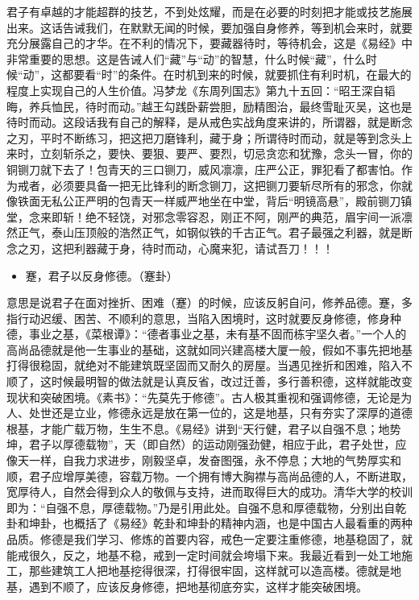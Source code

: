 君子有卓越的才能超群的技艺，不到处炫耀，而是在必要的时刻把才能或技艺施展出来。这话告诫我们，在默默无闻的时候，要加强自身修养，等到机会来时，就要充分展露自己的才华。在不利的情况下，要藏器待时，等待机会，这是《易经》中非常重要的思想。这是告诫人们“藏”与“动”的智慧，什么时候“藏”，什么时候“动”，这都要看“时”的条件。在时机到来的时候，就要抓住有利时机，在最大的程度上实现自己的人生价值。冯梦龙《东周列国志》第九十五回：“昭王深自韬晦，养兵恤民，待时而动。”越王勾践卧薪尝胆，励精图治，最终雪耻灭吴，这也是待时而动。这段话我有自己的解释，是从戒色实战角度来讲的，所谓器，就是断念之刃，平时不断练习，把这把刀磨锋利，藏于身；所谓待时而动，就是等到念头上来时，立刻斩杀之，要快、要狠、要严、要烈，切忌贪恋和犹豫，念头一冒，你的铜铡刀就下去了！包青天的三口铡刀，威风凛凛，庄严公正，罪犯看了都害怕。作为戒者，必须要具备一把无比锋利的断念铡刀，这把铡刀要斩尽所有的邪念，你就像铁面无私公正严明的包青天一样威严地坐在中堂，背后“明镜高悬”，殿前铡刀镇堂，念来即斩！绝不轻饶，对邪念零容忍，刚正不阿，刚严的典范，眉宇间一派凛然正气，泰山压顶般的浩然正气，如钢似铁的千古正气。君子最强之利器，就是断念之刃，这把利器藏于身，待时而动，心魔来犯，请试吾刀！！！

\begin{itemize}\it
    \item 蹇，君子以反身修德。（蹇卦）
\end{itemize}

意思是说君子在面对挫折、困难（蹇）的时候，应该反躬自问，修养品德。蹇，多指行动迟缓、困苦、不顺利的意思，当陷入困境时，这时就要反身修德，修身种德，事业之基，《菜根谭》：“德者事业之基，未有基不固而栋宇坚久者。”一个人的高尚品德就是他一生事业的基础，这就如同兴建高楼大厦一般，假如不事先把地基打得很稳固，就绝对不能建筑既坚固而又耐久的房屋。当遇见挫折和困难，陷入不顺了，这时候最明智的做法就是认真反省，改过迁善，多行善积德，这样就能改变现状和突破困境。《素书》：“先莫先于修德”。古人极其重视和强调修德，无论是为人、处世还是立业，修德永远是放在第一位的，这是地基，只有夯实了深厚的道德根基，才能广载万物，生生不息。《易经》讲到“天行健，君子以自强不息；地势坤，君子以厚德载物”，天（即自然）的运动刚强劲健，相应于此，君子处世，应像天一样，自我力求进步，刚毅坚卓，发奋图强，永不停息；大地的气势厚实和顺，君子应增厚美德，容载万物。一个拥有博大胸襟与高尚品德的人，不断进取，宽厚待人，自然会得到众人的敬佩与支持，进而取得巨大的成功。清华大学的校训即为：“自强不息，厚德载物。”乃是引用此处。自强不息和厚德载物，分别出自乾卦和坤卦，也概括了《易经》乾卦和坤卦的精神内涵，也是中国古人最看重的两种品质。修德是我们学习、修炼的首要内容，戒色一定要注重修德，地基稳固了，就能戒很久，反之，地基不稳，戒到一定时间就会垮塌下来。我最近看到一处工地施工，那些建筑工人把地基挖得很深，打得很牢固，这样就可以造高楼。德就是地基，遇到不顺了，应该反身修德，把地基彻底夯实，这样才能突破困境。

